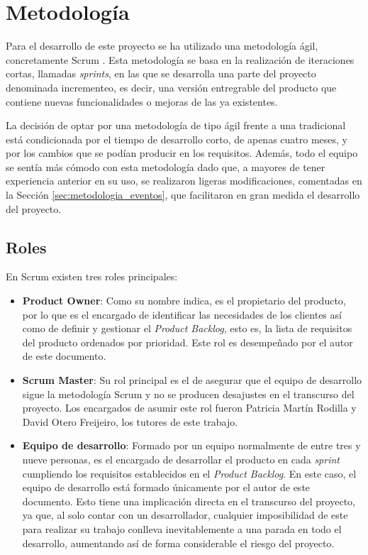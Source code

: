 \chapter{Metodología}
\label{chap:metodologia}

Para el desarrollo de este proyecto se ha utilizado una metodología ágil, concretamente Scrum \cite{scrum}.
Esta metodología se basa en la realización de iteraciones cortas, llamadas \textit{sprints}, en las que se desarrolla una parte del proyecto
denominada incrementeo, es decir, una versión entregrable del producto que contiene
nuevas funcionalidades o mejoras de las ya existentes. 

\bigskip
La decisión de optar por una metodología de tipo ágil frente a una tradicional
está condicionada por el tiempo de desarrollo corto, de apenas cuatro meses, y por los cambios que se podían producir en los requisitos.
Además, todo el equipo se sentía más cómodo con esta metodología dado que, a mayores de tener experiencia anterior en su uso, se realizaron
ligeras modificaciones, comentadas en la Sección \ref{sec:metodologia_eventos}, que facilitaron en gran medida el desarrollo del
proyecto.

\section{Roles}
\label{sec:metodologia_roles}

En Scrum existen tres roles principales:

\begin{itemize}
		\item \textbf{Product Owner}: Como su nombre indica, es el propietario del producto, por lo que es el encargado de identificar
		las necesidades de los clientes así como de definir y gestionar el \textit{Product Backlog}, esto es, la lista de requisitos del producto ordenados por prioridad.
		Este rol es desempeñado por el autor de este documento.
		\item \textbf{Scrum Master}: Su rol principal es el de asegurar que el equipo de desarrollo sigue la metodología Scrum y no se producen
		desajustes en el transcurso del proyecto. Los encargados de asumir este rol fueron Patricia Martín Rodilla y David Otero Freijeiro, los
		tutores de este trabajo.
		\item \textbf{Equipo de desarrollo}: Formado por un equipo normalmente de entre tres y nueve personas, es el encargado de desarrollar el producto
		en cada \textit{sprint} cumpliendo los requisitos establecidos en el \textit{Product Backlog}. En este caso, el equipo de desarrollo está
		formado únicamente por el autor de este documento. Esto tiene una implicación directa en el transcurso del proyecto, ya que,
		al solo contar con un desarrollador, cualquier imposibilidad de este para realizar su trabajo conlleva inevitablemente a una parada en todo el desarrollo,
		aumentando así de forma considerable el riesgo del proyecto.
\end{itemize}

